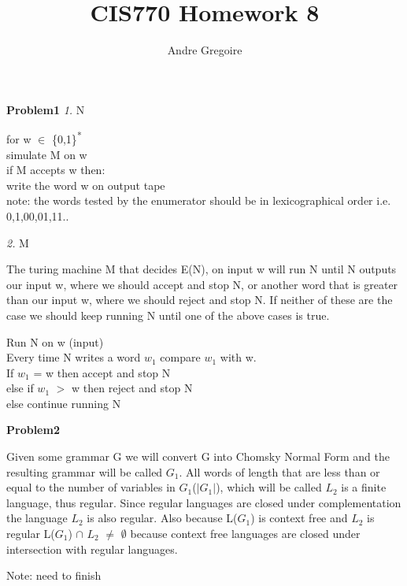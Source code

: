 \documentclass[12pt]{report}
\begin{document}
\newcommand\tab[1][1cm]{\hspace*{#1}}

\author{Andre Gregoire}
\title{CIS770 Homework 8}
\maketitle

\textbf{Problem1}\newline
\textit{1.} N 
\begin{addmargin}[1cm]{0em}
for w $\in$ \{0,1\}\textsuperscript{*} \\
simulate M on w\\
if M accepts w then: \\
\tab write the word w on output tape\\

note: the words tested by the enumerator should be in lexicographical order i.e. 0,1,00,01,11..
\end{addmargin}

\textit{2.} M
\begin{addmargin}[1cm]{0em}
The turing machine M that decides E(N), on input w will run N until N outputs our input w, where we should accept and stop N, or another word that is greater than our input w, where we should reject and  stop N.  If neither of these are the case we should keep running N until one of the above cases is true.


Run N on w (input) \\
Every time N writes a word $w_1$ compare $w_1$ with w.\\
\tab If $w_1$ = w then accept and stop N\\
\tab else if $w_1$ $>$ w then reject and stop N\\
\tab else continue running N\\
\end{addmargin}

\textbf{Problem2}\\
\begin{addmargin}[1cm]{0em}
Given some grammar G we will convert G into Chomsky Normal Form and the resulting grammar will be called $G_1$.  All words of length that are less than or equal to the number of variables in $G_1$($\vert G_1 \vert$), which will be called $L_2$  is a finite language, thus regular.  Since regular languages are closed under complementation the language $L_2$ is also regular. Also because L($G_1$) is context free and $L_2$ is regular L($G_1$) $\cap$ $L_2$ $\neq$ $\emptyset$ because context free languages are closed under intersection with regular languages.

{\footnotesize Note: need to finish }
\end{addmargin}
\end{document}
